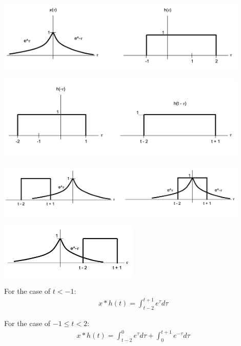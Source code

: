\documentclass{article}
\begin{document}
\begin{center}
    \includegraphics[width=0.9\textwidth]{43b1.png}
\end{center}
\begin{center}
    \includegraphics[width=0.9\textwidth]{43b2.png}
\end{center}
\begin{center}
    \includegraphics[width=0.9\textwidth]{43b3.png}
\end{center}
\begin{center}
    \includegraphics[width=0.5\textwidth]{43b4.png}
\end{center}

For the case of $t < -1$:
\begin{equation*}
\begin{split}
    x * h(t) = \int_{t - 2}^{t + 1}e^{\tau}d\tau
\end{split}
\end{equation*}

For the case of $-1 \leq t < 2$:
\begin{equation*}
\begin{split}
    x * h(t) = \int_{t - 2}^{0}e^{\tau}d\tau + \int_{0}^{t + 1}e^{-\tau}d\tau
\end{split}
\end{equation*}
\end{document}
